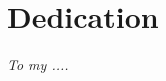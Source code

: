 \documentclass[letterpaper,12pt,openany]{report}
\begin{document}













\chapter*{\centering Dedication}
\textit{\LARGE\centering  To my ....}

\end{document}
